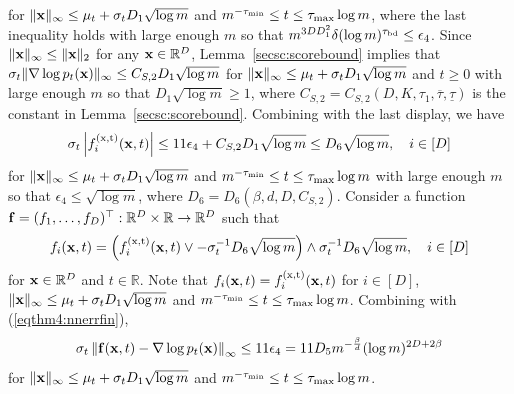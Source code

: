 \documentclass[twoside,11pt]{article}
\newcommand{\bff}{{\bf f}}
\newcommand{\bx}{{\bf x}}
\newcommand{\bbR}{{\mathbb R}}
\newcommand{\be}{\begin{equation}}
\newcommand{\ee}{\end{equation}}
\newcommand{\bean}{\setlength\arraycolsep{1pt}\begin{eqnarray*}}
\newcommand{\eean}{\end{eqnarray*}}
\begin{document}
for $\|\bx\|_{\infty} \leq  \mu_t + \sigma_t D_{1} \sqrt{\log m}$ and $m^{-\tau_{\rm min}} \leq t \leq \tau_{\rm max} \log m$, where the last inequality holds with large enough $m$ so that $m^{3D D_1^2} \delta (\log m)^{\tau_{\rm bd}} \leq \epsilon_{4}$.
Since $\| \bx \|_{\infty} \leq \|\bx\|_{2}$ for any $\bx \in \bbR^{D}$, Lemma~\ref{secsc:scorebound} implies that $\sigma_{t} \| \nabla \log p_t(\bx) \|_{\infty} \leq C_{S,2} D_{1} \sqrt{\log m} $ for $\|\bx\|_{\infty} \leq  \mu_t + \sigma_t D_{1} \sqrt{\log m}$ and $t \geq 0$ with large enough $m$ so that $D_{1} \sqrt{\log m} \geq 1$, where $C_{S,2} = C_{S,2}(D,K,\tau_{1}, \overline{\tau}, \underline{\tau})$ is the constant in Lemma~\ref{secsc:scorebound}. 
Combining with the last display, we have
\bean
\sigma_{t} \left\vert f_i^{(\rm x,t)} (\bx,t) \right\vert \leq 11\epsilon_{4} + C_{S,2} D_{1} \sqrt{\log m} \leq D_{6} \sqrt{\log m}, \quad i \in [D]
\eean
for $\|\bx\|_{\infty} \leq  \mu_t + \sigma_t D_{1} \sqrt{\log m}$ and $m^{-\tau_{\rm min}} \leq t \leq \tau_{\rm max} \log m$ with large enough $m$ so that $\epsilon_{4} \leq \sqrt{\log m}$, where $D_{6} = D_{6}(\beta,d,D,C_{S,2})$.
Consider a function $\bff = (f_1,\ldots,f_{D})^{\top} : \bbR^{D} \times \bbR \to \bbR^{D}$ such that
\bean
 f_i(\bx, t) 
= \left( f_i^{(\rm x,t)} (\bx,t) \vee - \sigma_{t}^{-1} D_6 \sqrt{\log m} \right) \wedge \sigma_{t}^{-1} D_6 \sqrt{\log m}, \quad i \in [D]
\eean
for $\bx \in \bbR^{D}$ and $t \in \bbR$.
Note that $f_i(\bx,t) = f_i^{(\rm x,t)} (\bx,t)$ for $i \in [D]$, $\|\bx\|_{\infty} \leq  \mu_t + \sigma_t D_{1} \sqrt{\log m}$ and $m^{-\tau_{\rm min}} \leq t \leq \tau_{\rm max} \log m$.
Combining with (\ref{eqthm4:nnerrfin}),
\be
\sigma_{t} \left\| \bff (\bx,t) - \nabla \log p_t (\bx)  \right\|_{\infty} 
\leq 11 \epsilon_{4} = 11 D_{5} m^{-\frac{\beta}{d}} (\log m)^{2D + 2\beta} \label{eqthm4:nnerrwhole}
\ee
for $\|\bx\|_{\infty} \leq  \mu_t + \sigma_t D_{1} \sqrt{\log m}$ and $m^{-\tau_{\rm min}} \leq t \leq \tau_{\rm max} \log m$.
\end{document}

